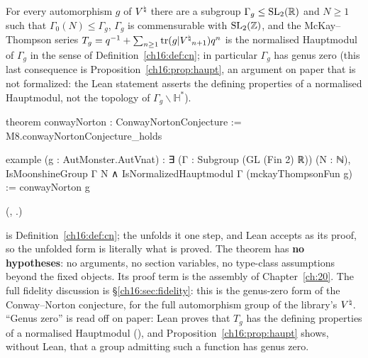 \begin{theorem}\label{ch16:thm:conwayNorton}
For every automorphism $g$ of ${V^{\natural}}$ there are a subgroup $\Gamma_g\le\mathrm{SL}_2(\mathbb{R})$ and $N\ge1$ such that
$\Gamma_0(N)\le\Gamma_g$, $\Gamma_g$ is commensurable with $\mathrm{SL}_2(\mathbb{Z})$, and the McKay--Thompson series
$T_g=q^{-1}+\sum_{n\ge1}\operatorname{tr}(g|{V^{\natural}}_{n+1})q^n$ is the normalised Hauptmodul of $\Gamma_g$ in the sense of Definition~\ref{ch16:def:cn}; in particular $\Gamma_g$ has
genus zero (this last consequence is Proposition~\ref{ch16:prop:haupt}, an argument on paper that is not formalized:
the Lean statement asserts the defining properties of a normalised Hauptmodul, not the topology of
$\Gamma_g\backslash\mathbb H^{*}$).
\end{theorem}
\begin{leancode}
theorem conwayNorton : ConwayNortonConjecture :=
  M8.conwayNortonConjecture_holds

example (g : AutMonster.AutVnat) : ∃ (Γ : Subgroup (GL (Fin 2) ℝ)) (N : ℕ), IsMoonshineGroup Γ N ∧
    IsNormalizedHauptmodul Γ (mckayThompsonFun g) :=
  conwayNorton g
\end{leancode}
(, .)
\begin{dictionary}
 is Definition~\ref{ch16:def:cn}; the  unfolds it one step, and Lean accepts
 as its proof, so the unfolded form is literally what is proved.  The theorem has \textbf{no
hypotheses}: no arguments, no section variables, no type-class assumptions beyond the fixed objects.  Its proof term
 is the assembly of Chapter~\ref{ch:20}.  The full fidelity discussion is
\S\ref{ch16:sec:fidelity}: this is the genus-zero form of the Conway--Norton conjecture, for the full automorphism group
of the library's ${V^{\natural}}$.  ``Genus zero'' is read off on paper: Lean proves that $T_g$ has the defining properties of
a normalised Hauptmodul (), and Proposition~\ref{ch16:prop:haupt} shows, without Lean, that
a group admitting such a function has genus zero.
\end{dictionary}

